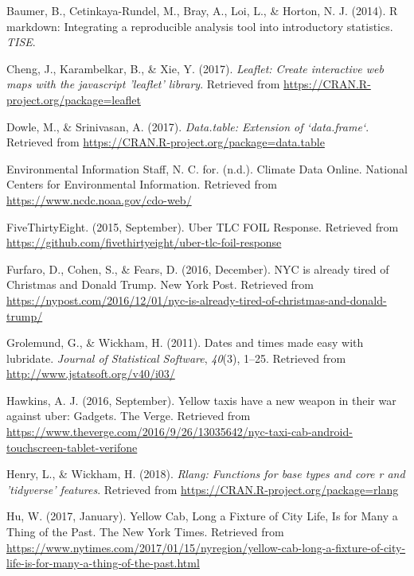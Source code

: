 \documentclass[12pt,twoside]{reedthesis}
\theoremstyle{definition}
\theoremstyle{definition}
\theoremstyle{definition}
\theoremstyle{remark}
\begin{document}
\hypertarget{ref-baumer2014}{}
Baumer, B., Cetinkaya-Rundel, M., Bray, A., Loi, L., \& Horton, N. J.
(2014). R markdown: Integrating a reproducible analysis tool into
introductory statistics. \emph{TISE}.

\hypertarget{ref-pkgleaflet}{}
Cheng, J., Karambelkar, B., \& Xie, Y. (2017). \emph{Leaflet: Create
interactive web maps with the javascript 'leaflet' library}. Retrieved
from \url{https://CRAN.R-project.org/package=leaflet}

\hypertarget{ref-pkgdatatable}{}
Dowle, M., \& Srinivasan, A. (2017). \emph{Data.table: Extension of
`data.frame`}. Retrieved from
\url{https://CRAN.R-project.org/package=data.table}

\hypertarget{ref-noaa}{}
Environmental Information Staff, N. C. for. (n.d.). Climate Data Online.
National Centers for Environmental Information. Retrieved from
\url{https://www.ncdc.noaa.gov/cdo-web/}

\hypertarget{ref-uber538}{}
FiveThirtyEight. (2015, September). Uber TLC FOIL Response. Retrieved
from \url{https://github.com/fivethirtyeight/uber-tlc-foil-response}

\hypertarget{ref-furfaro2016}{}
Furfaro, D., Cohen, S., \& Fears, D. (2016, December). NYC is already
tired of Christmas and Donald Trump. New York Post. Retrieved from
\url{https://nypost.com/2016/12/01/nyc-is-already-tired-of-christmas-and-donald-trump/}

\hypertarget{ref-pkglubridate}{}
Grolemund, G., \& Wickham, H. (2011). Dates and times made easy with
lubridate. \emph{Journal of Statistical Software}, \emph{40}(3), 1--25.
Retrieved from \url{http://www.jstatsoft.org/v40/i03/}

\hypertarget{ref-andrew2016}{}
Hawkins, A. J. (2016, September). Yellow taxis have a new weapon in
their war against uber: Gadgets. The Verge. Retrieved from
\url{https://www.theverge.com/2016/9/26/13035642/nyc-taxi-cab-android-touchscreen-tablet-verifone}

\hypertarget{ref-pkgrlang}{}
Henry, L., \& Wickham, H. (2018). \emph{Rlang: Functions for base types
and core r and 'tidyverse' features}. Retrieved from
\url{https://CRAN.R-project.org/package=rlang}

\hypertarget{ref-hu2017}{}
Hu, W. (2017, January). Yellow Cab, Long a Fixture of City Life, Is for
Many a Thing of the Past. The New York Times. Retrieved from
\url{https://www.nytimes.com/2017/01/15/nyregion/yellow-cab-long-a-fixture-of-city-life-is-for-many-a-thing-of-the-past.html}
\end{document}
